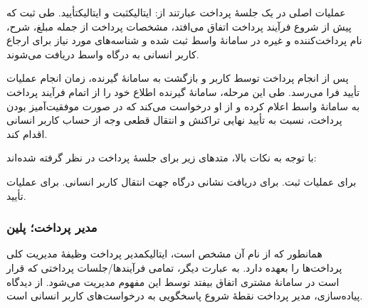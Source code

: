 عملیات اصلی در یک جلسهٔ پرداخت عبارتند از:
‌ایتالیک{ثبت} و
‌ایتالیک{تأیید}.
طی ثبت که پیش از شروع فرآیند پرداخت
اتفاق می‌افتد، مشخصات پرداخت از جمله مبلغ،
شرح، نام پرداخت‌کننده و غیره در سامانهٔ واسط
ثبت شده و شناسه‌های مورد نیاز برای ارجاع
کاربر انسانی به درگاه واسط دریافت می‌شوند.

پس از انجام پرداخت توسط کاربر و
بازگشت به سامانهٔ گیرنده، زمان انجام
عملیات تأیید فرا می‌رسد. طی این مرحله، سامانهٔ
گیرنده اطلاع خود را از اتمام فرآیند پرداخت
به سامانهٔ واسط اعلام کرده و از او درخواست می‌کند
که در صورت موفقیت‌آمیز بودن پرداخت، نسبت به
تأیید نهایی تراکنش و انتقال قطعی وجه از حساب
کاربر انسانی اقدام کند.

با توجه به نکات بالا، متدهای زیر برای جلسهٔ پرداخت
در نظر گرفته شده‌اند:
\begin{itemize}
	  برای عملیات ثبت.
	  برای دریافت نشانی
	درگاه جهت انتقال کاربر انسانی.
	  برای عملیات تأیید.
\end{itemize}

\subsubsection{مدیر پرداخت؛ ‌پلین{}}
همانطور که از نام آن مشخص است،
‌ایتالیک{مدیر پرداخت} وظیفهٔ مدیریت کلی
پرداخت‌ها را بعهده دارد. به عبارت دیگر، تمامی
فرآیندها/جلسات پرداختی که قرار است در سامانهٔ
مشتری اتفاق بیفتد توسط این مفهوم مدیریت می‌شود.
از دیدگاه پیاده‌سازی، مدیر پرداخت نقطهٔ شروع
پاسخگویی به درخواست‌های کاربر انسانی است.